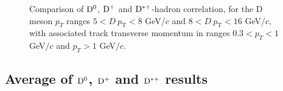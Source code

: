 
\begin{figure}
\centering
\caption{Comparison of ${\rm D^0}$, ${\rm D^+}$ and ${\rm D^{*+}}$-hadron correlation, for the D meson $p_{T}$ ranges $5 < D\ p_\text{T} < 8$ GeV/$c$ and $8 < D\ p_\text{T} < 16$ GeV/$c$, with associated track transverse momentum in ranges $0.3 < p_{T} < 1$ GeV$/c$ and $p_{T} > 1$ GeV$/c$.}
\label{fig:Data_CompareDZeroDStarDPlus}
\end{figure}


\subsection{Average of ${\rm D^0}$, ${\rm D^+}$ and ${\rm D^{*+}}$ results}

